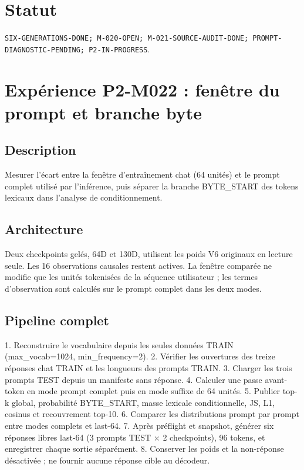 \documentclass[11pt,a4paper]{report}
\begin{document}
\section{Statut}
\begin{sloppypar}
\texttt{SIX-GENERATIONS-DONE; M-020-OPEN; M-021-SOURCE-AUDIT-DONE; PROMPT-DIAGNOSTIC-PENDING; P2-IN-PROGRESS}.
\end{sloppypar}



\section*{Expérience P2-M022 : fenêtre du prompt et branche byte}
\subsection*{Description}
Mesurer l'écart entre la fenêtre d'entraînement chat (64 unités) et le prompt complet utilisé par l'inférence, puis séparer la branche BYTE\_START des tokens lexicaux dans l'analyse de conditionnement.
\subsection*{Architecture}
Deux checkpoints gelés, 64D et 130D, utilisent les poids V6 originaux en lecture seule. Les 16 observations causales restent actives. La fenêtre comparée ne modifie que les unités tokenisées de la séquence utilisateur ; les termes d'observation sont calculés sur le prompt complet dans les deux modes.
\subsection*{Pipeline complet}
\begin{sloppypar}
1. Reconstruire le vocabulaire depuis les seules données TRAIN (max\_vocab=1024, min\_frequency=2).
2. Vérifier les ouvertures des treize réponses chat TRAIN et les longueurs des prompts TRAIN.
3. Charger les trois prompts TEST depuis un manifeste sans réponse.
4. Calculer une passe avant-token en mode prompt complet puis en mode suffixe de 64 unités.
5. Publier top-k global, probabilité BYTE\_START, masse lexicale conditionnelle, JS, L1, cosinus et recouvrement top-10.
6. Comparer les distributions prompt par prompt entre modes complets et last-64.
7. Après préflight et snapshot, générer six réponses libres last-64 (3 prompts TEST × 2 checkpoints), 96 tokens, et enregistrer chaque sortie séparément.
8. Conserver les poids et la non-réponse désactivée ; ne fournir aucune réponse cible au décodeur.
\end{sloppypar}
\end{document}
